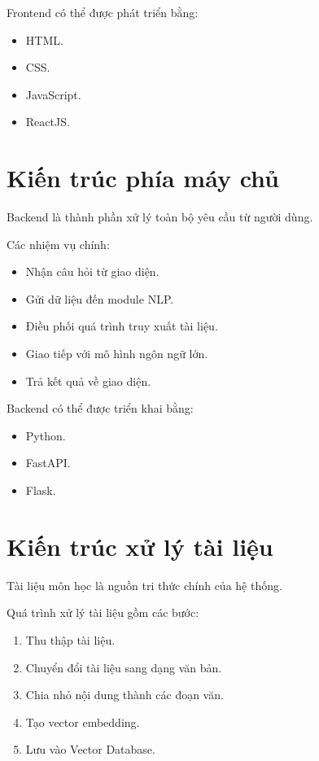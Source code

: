 \documentclass[12pt,a4paper]{report}
\begin{document}
	Frontend có thể được phát triển bằng:
	
	\begin{itemize}
		\item HTML.
		\item CSS.
		\item JavaScript.
		\item ReactJS.
	\end{itemize}
	
	\section{Kiến trúc phía máy chủ}
	
	Backend là thành phần xử lý toàn bộ yêu cầu từ người dùng.
	
	Các nhiệm vụ chính:
	
	\begin{itemize}
		\item Nhận câu hỏi từ giao diện.
		\item Gửi dữ liệu đến module NLP.
		\item Điều phối quá trình truy xuất tài liệu.
		\item Giao tiếp với mô hình ngôn ngữ lớn.
		\item Trả kết quả về giao diện.
	\end{itemize}
	
	Backend có thể được triển khai bằng:
	
	\begin{itemize}
		\item Python.
		\item FastAPI.
		\item Flask.
	\end{itemize}
	
	\section{Kiến trúc xử lý tài liệu}
	
	Tài liệu môn học là nguồn tri thức chính của hệ thống.
	
	Quá trình xử lý tài liệu gồm các bước:
	
	\begin{enumerate}
		\item Thu thập tài liệu.
		\item Chuyển đổi tài liệu sang dạng văn bản.
		\item Chia nhỏ nội dung thành các đoạn văn.
		\item Tạo vector embedding.
		\item Lưu vào Vector Database.
	\end{enumerate}
	
\end{document}

